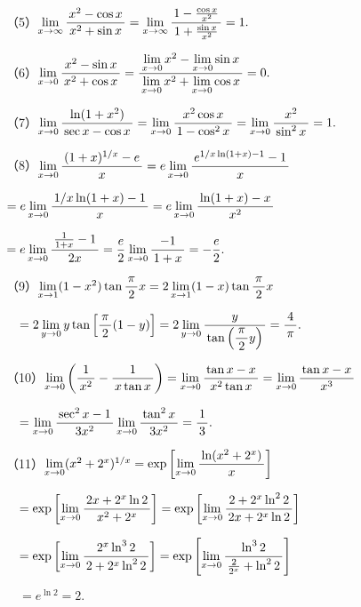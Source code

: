 \begin{frame}
	\linespread{1.5}
	
	
 	\small 	
	（5）$\limx{\infty}\df{x^2-\cos x}{x^2+\sin x}
	=\limx{\infty}\df{1-\frac{\cos x}{x^2}}{1+\frac{\sin x}{x^2}}=1.$
	
	
	\pause	
	（6）$\limx{0}\df{x^2-\sin x}{x^2+\cos x}
	=\df{\limx{0}x^2-\limx{0}\sin x}{\limx{0}x^2+\limx{0}\cos x}=0.$
	
	
	\pause
	（7）$\limx{0}\df{\ln(1+x^2)}{\sec x-\cos x}
	=\limx{0}\df{x^2\cos x}{1-\cos^2 x}
	=\limx{0}\df{x^2}{\sin^2 x}=1.$
	
	\pause
	（8）$\limx{0}\df{(1+x)^{1/x}-e}{x}
	=e\limx{0}\df{e^{1/x\ln(1+x)-1}-1}{x}$
	
	\quad$=e\limx{0}\df{1/x\ln(1+x)-1}{x}
	=e\limx{0}\df{\ln(1+x)-x}{x^2}$
	
	\quad$=e\limx{0}\df{\frac1{1+x}-1}{2x}
	=\frac e2\limx{0}\df{-1}{1+x}=-\frac e2.$
\end{frame}

\begin{frame}
	\linespread{1.5}
	
	
 	\small 
	（9）$\limx{1}(1-x^2)\tan\df{\pi}{2}x
	=2\limx{1}(1-x)\tan\df{\pi}{2}x
	$
	
	$\quad=2\lim\limits_{y\to0}y\tan\left[\df{\pi}2(1-y)\right]
	=2\lim\limits_{y\to0}\df y{\tan\left(\df{\pi}2y\right)}
	=\df4{\pi}.$
	
	\pause	
	（10）$\limx{0}\left(\df 1{x^2}-\df 1{x\tan x}\right)
	=\limx{0}\df {\tan x-x}{x^2\tan x}
	=\limx{0}\df {\tan x-x}{x^3}$
	
	$\quad
	=\limx{0}\df {\sec^2 x-1}{3x^2}
	\limx{0}\df {\tan^2 x}{3x^2}=\df13.$
	
	\pause	
	（11）$\limx{0}(x^2+2^x)^{1/x}
	=\exp\left[\limx{0}\df{\ln(x^2+2^x)}x\right]
	$
	
	$\quad=\exp\left[\limx{0}\df{2x+2^x\ln 2}{x^2+2^x}\right]
	=\exp\left[\limx{0}\df{2+2^x\ln^2 2}{2x+2^x\ln2}\right]$
	
	$\quad
	=\exp\left[\limx{0}\df{2^x\ln^3 2}{2+2^x\ln^22}\right]
	=\exp\left[\limx{0}\df{\ln^3 2}{\frac2{2^x}+\ln^22}\right]
	$
	
	$\quad
	=e^{\ln 2}=2.$
\end{frame}

